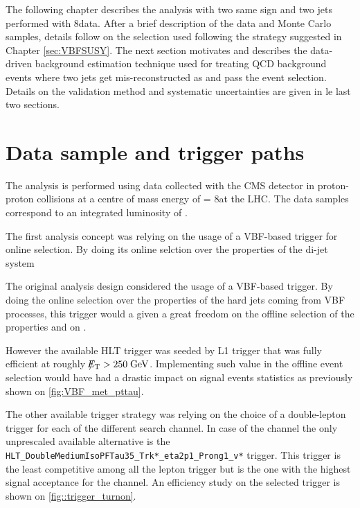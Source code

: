
The following chapter describes the analysis with two same sign \hadtau and two jets performed with 8\tev data. After a brief description of the data and Monte Carlo samples, details follow on the selection used following the strategy suggested in Chapter \ref{sec:VBFSUSY}. The next section motivates and describes the data-driven background estimation technique used for treating QCD background events where two jets get mis-reconstructed as \hadtau and pass the event selection. Details on the validation method and systematic uncertainties are given in le last two sections.

\section {Data sample and trigger paths}
\FloatBarrier

The analysis is performed using data collected with the CMS detector
in proton-proton collisions at a centre of mass energy of \CM = 8\tev at the LHC. The data samples correspond to an integrated luminosity of \lumiOld. 

The first analysis concept was relying on the usage of a VBF-based trigger for online selection. By doing its online selction  over the properties of the di-jet system

The original analysis design considered the usage of a VBF-based trigger. By doing the online selection over the properties of the hard jets coming from VBF processes, this trigger would a given a great freedom on the offline selection of the \hadtau properties and on \met.

However the available HLT trigger was seeded by \met L1 trigger that was fully efficient at roughly $\slash\mkern-12mu{E}_{\text{T}} > 250\;\text{Ge}\kern-0.06667em\text{V}$. Implementing such value in the offline event selection would have had a drastic impact on signal events statistics as previously shown on \autoref{fig:VBF_met_pttau}.

The other available trigger strategy was relying on the choice of a double-lepton trigger for each of the different search channel. In case of the \hadtau\hadtau channel the only unprescaled available alternative is the \texttt{HLT\_\-DoubleMedium\-IsoPFTau35\_\-Trk*\_\-eta2p1\_\-Prong1\_\-v*} trigger. This trigger is the least competitive among all the lepton trigger but is the one with the highest signal acceptance for the \hadtau channel. An efficiency study on the selected trigger is shown on \autoref{fig::trigger_turnon}.

